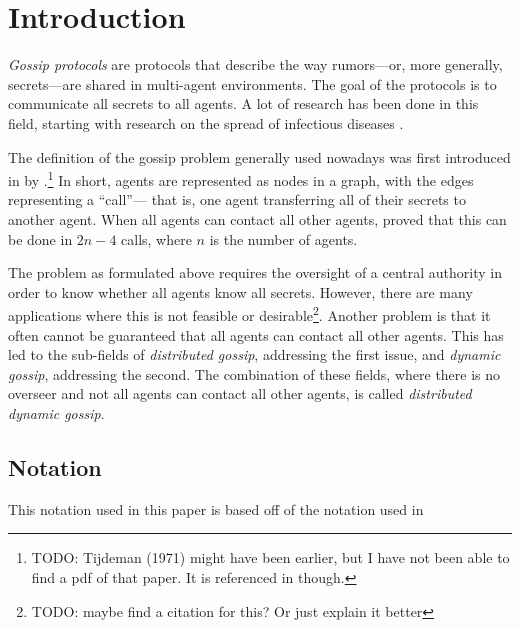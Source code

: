 
\section{Introduction}\label{sec:introduction}

\textit{Gossip protocols} are protocols that describe the way rumors---or, more generally, secrets---are shared in multi-agent environments.
The goal of the protocols is to communicate all secrets to all agents.
A lot of research has been done in this field, 
starting with research on the spread of infectious diseases \parencite{kermack_contribution_1927}.

The definition of the gossip problem generally used nowadays was first introduced in \citeyear{hajnal_cure_1972} by \citeauthor{hajnal_cure_1972}.\footnote{TODO: Tijdeman (1971) might have been earlier, but I have not been able to find a pdf of that paper. It is referenced in \Textcite{van_ditmarsch_dynamic_2018} though.}
In short, agents are represented as nodes in a graph, with the edges representing a ``call''---%
that is, one agent transferring all of their secrets to another agent.
When all agents can contact all other agents, \citeauthor{hajnal_cure_1972} proved that this can be done in \(2n-4\) calls, where \(n\) is the number of agents.

The problem as formulated above requires the oversight of a central authority in order to know whether all agents know all secrets.
However, there are many applications where this is not feasible or desirable\footnote{TODO: maybe find a citation for this? Or just explain it better}.
Another problem is that it often cannot be guaranteed that all agents can contact all other agents.
This has led to the sub-fields of \textit{distributed gossip}, addressing the first issue, and \textit{dynamic gossip}, addressing the second.
The combination of these fields, where there is no overseer and not all agents can contact all other agents, is called \textit{distributed dynamic gossip}.





\subsection{Notation}

This notation used in this paper is based off of the notation used in \Textcite{van_ditmarsch_dynamic_2018}
